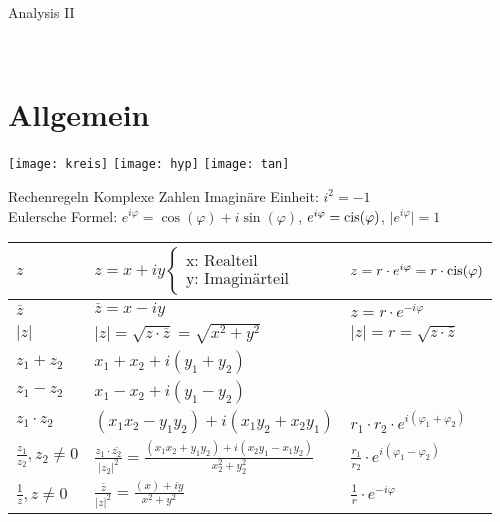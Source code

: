 \begin{center}
\begin{Huge}Analysis II\end{Huge}\\
\end{center}

\vspace{-2em}
\section{Allgemein}

\texttt{[image: kreis]}
\texttt{[image: hyp]}
\texttt{[image: tan]}

\begin{Rechenregeln}{Rechenregeln Komplexe Zahlen}{}
    Imaginäre Einheit: \(i^{2} = -1\) \\
    Eulersche Formel: \( e^{i\varphi} = \cos(\varphi) + i\sin(\varphi) \), \(e^{i\varphi} = \operatorname{cis}(\varphi)\), \(\vert e^{i\varphi}\vert = 1\)	\\
    \begin{tabular}{|l|l|l|}
        \hline
        \(z\) & $ z = x + iy  \left\{
        \begin{array}{l}
        \text{x: Realteil}\\ \text{y: Imaginärteil}
        \end{array}
        \right. $  & \(z = r \cdot e^{i\varphi} = r \cdot \operatorname{cis}(\varphi)  \)\\ 
        \hline
        \(\overline{z}\) & \(\overline{z} = x - iy\) & \(z = r \cdot e^{-i\varphi}\)\\ 
        \hline
        \(\vert z \vert\) & \(\vert z \vert = \sqrt{z \cdot \overline{z}} = \sqrt{x^{2} + y^{2}}\) & \(\vert z \vert = r =\sqrt{z \cdot \overline{z}}\)\\ 
        \hline
        \(z_1 + z_2\) & \(x_1+x_2 + i(y_1+y_2)\) & \\
        \hline
        \(z_1 - z_2\) & \(x_1-x_2 + i(y_1-y_2)\) & \\
        \hline
        \(z_1 \cdot z_2\) & \((x_1x_2 - y_1y_2) + i(x_1y_2 + x_2y_1)\) & \(r_1 \cdot r_2 \cdot 
        e^{i(\varphi_1+\varphi_2)}\)\\
        \hline
        \(\frac{z_1}{z_2}, z_2 \neq 0\) & \(\frac{z_1 \cdot \overline{z_2}}{\vert z_2 \vert ^{2}} = \frac{(x_1x_2+y_1y_2)+i(x_2y_1-x_1y_2)}{x_2^{2}+y_2^{2}} \) & \(\frac{r_1}{r_2} \cdot e^{i(\varphi_1 - \varphi_2)}\)\\
        \hline
        \(\frac{1}{z}, z \neq 0\) & \(\frac{\overline{z}}{\vert z \vert ^{2}} = \frac{(x)+iy}{x^{2}+y^{2}} \) & \(\frac{1}{r} \cdot e^{-i\varphi}\)\\

\end{tabular}
\end{Rechenregeln}

